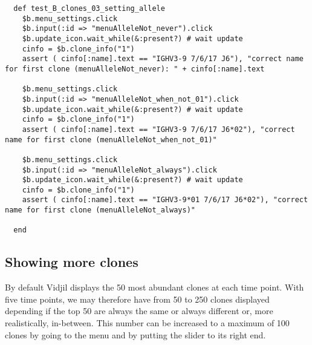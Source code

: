 \begin{verbatim}
  def test_B_clones_03_setting_allele
    $b.menu_settings.click
    $b.input(:id => "menuAlleleNot_never").click
    $b.update_icon.wait_while(&:present?) # wait update
    cinfo = $b.clone_info("1")
    assert ( cinfo[:name].text == "IGHV3-9 7/6/17 J6"), "correct name for first clone (menuAlleleNot_never): " + cinfo[:name].text

    $b.menu_settings.click
    $b.input(:id => "menuAlleleNot_when_not_01").click
    $b.update_icon.wait_while(&:present?) # wait update
    cinfo = $b.clone_info("1")
    assert ( cinfo[:name].text == "IGHV3-9 7/6/17 J6*02"), "correct name for first clone (menuAlleleNot_when_not_01)"

    $b.menu_settings.click
    $b.input(:id => "menuAlleleNot_always").click
    $b.update_icon.wait_while(&:present?) # wait update
    cinfo = $b.clone_info("1")
    assert ( cinfo[:name].text == "IGHV3-9*01 7/6/17 J6*02"), "correct name for first clone (menuAlleleNot_always)"

  end
\end{verbatim}

\subsection{Showing more clones}

By default Vidjil displays the 50 most abundant clones at each time point.
With five time points, we may therefore have from 50 to 250 clones displayed
depending if the top 50 are always the same or always different or, more
realistically, in-between.
This number can be increased to a maximum of 100 clones by going to the  menu and by putting the
slider to its right end.

